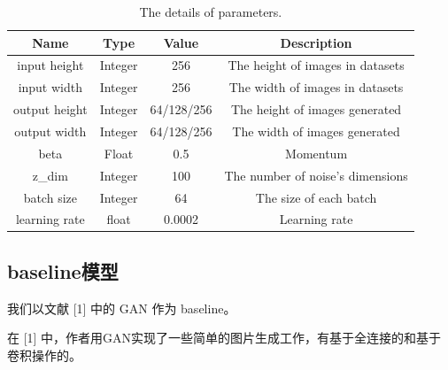 \documentclass{article}
\begin{document}
\begin{CJK*}{UTF8}{gbsn}
   	\begin{table}[!h]
   		\label{table_parameters}
   		\begin{center}
   			\begin{tabular}{|c|c|c|c|}
   				\hline
   				Name	               & 	Type	&		Value		& 		Description \\
   				\hline
   				input height           &	Integer	&       256         &       The height of images in datasets    \\
   				\hline
   				input width            &	Integer	&       256         &       The width of images in datasets    \\
   				\hline
   				output height          &	Integer	&       64/128/256  &       The height of images generated    \\
   				\hline
   				output width           &	Integer	&       64/128/256  &       The width of images generated    \\
   				\hline
   				beta                   &	Float	&       0.5         &       Momentum    \\
   				\hline
   				z\_dim                 &	Integer	&       100         &       The number of noise's dimensions    \\
   				\hline
   				batch size             &	Integer	&       64          &       The size of each batch    \\
   				\hline
   				learning rate          &	float	&       0.0002      &       Learning rate    \\
   				\hline
   			\end{tabular}
   			\vspace{10pt}
   			\caption{The details of parameters.}
   		\end{center}
   	\end{table}

  \subsection{baseline模型}

	我们以文献 [1] 中的 GAN 作为 baseline。
	
	在 [1] 中，作者用GAN实现了一些简单的图片生成工作，有基于全连接的和基于卷积操作的。


\end{CJK*}
\end{document}
